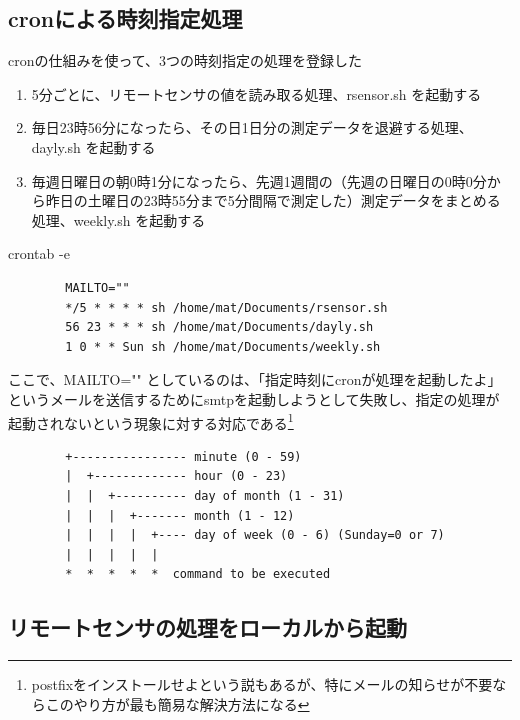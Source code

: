 \documentclass[12pt,a4paper,uplatex]{jsarticle}
\begin{document}

\subsection{cronによる時刻指定処理}

cronの仕組みを使って、3つの時刻指定の処理を登録した
\begin{enumerate}
	\item[(1)] 5分ごとに、リモートセンサの値を読み取る処理、rsensor.sh を起動する
	\item[(2)] 毎日23時56分になったら、その日1日分の測定データを退避する処理、dayly.sh を起動する
	\item[(3)] 毎週日曜日の朝0時1分になったら、先週1週間の（先週の日曜日の0時0分から昨日の土曜日の23時55分まで5分間隔で測定した）測定データをまとめる処理、weekly.sh を起動する
\end{enumerate}

\begin{itembox}[l]{crontab -e}
	\begin{verbatim}
		MAILTO=""
		*/5 * * * * sh /home/mat/Documents/rsensor.sh
		56 23 * * * sh /home/mat/Documents/dayly.sh
		1 0 * * Sun sh /home/mat/Documents/weekly.sh
	\end{verbatim}
\end{itembox}

ここで、MAILTO="" としているのは、「指定時刻にcronが処理を起動したよ」というメールを送信するためにsmtpを起動しようとして失敗し、指定の処理が起動されないという現象に対する対応である\footnote{postfixをインストールせよという説もあるが、特にメールの知らせが不要ならこのやり方が最も簡易な解決方法になる}

\begin{screen}
	\begin{verbatim}
		+---------------- minute (0 - 59)
		|  +------------- hour (0 - 23)
		|  |  +---------- day of month (1 - 31)
		|  |  |  +------- month (1 - 12)
		|  |  |  |  +---- day of week (0 - 6) (Sunday=0 or 7)
		|  |  |  |  |
		*  *  *  *  *  command to be executed
	\end{verbatim}
\end{screen}

\newpage

\subsection{リモートセンサの処理をローカルから起動}
\end{document}
